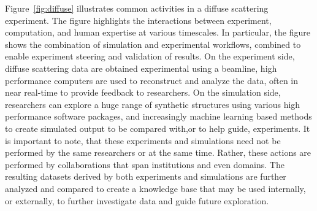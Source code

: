 \documentclass{aip-cp}
\newcommand\ian[1]{}
\newcommand\kyle[1]{}
\newcommand\ian[1]{{\color{red}[Ian: #1]}}
\newcommand\kyle[1]{{\color{purple}[Kyle: #1]}}
\begin{document}


 
\ian{Next text and Figure~\ref{fig:diffuse} are from~\cite{foster2015networking}. Need to be rewritten.}
\kyle{re-written}

Figure~\ref{fig:diffuse} illustrates common activities in a diffuse scattering experiment. 
The figure highlights the interactions between experiment, computation, and human expertise
at various timescales. In particular, the figure shows the combination of simulation and 
experimental workflows, combined to enable experiment steering and validation of results.
On the experiment side, diffuse scattering data are obtained experimental using a beamline, 
high performance computers are used to reconstruct and analyze the data, often in
near real-time to provide feedback to researchers. 
On the simulation side, researchers can explore a huge range of synthetic structures
using various high performance software packages, and increasingly machine learning
based methods to create simulated output to be compared with,or to help guide, experiments. 
It is important to note, that these experiments and simulations need not be performed
by the same researchers or at the same time. Rather, these actions are performed by
collaborations that span institutions and even domains. 
The resulting datasets derived by both experiments and simulations are further analyzed
and compared to create a knowledge base that may be used internally, or externally, 
to further investigate data and guide future exploration.
 

\end{document}
